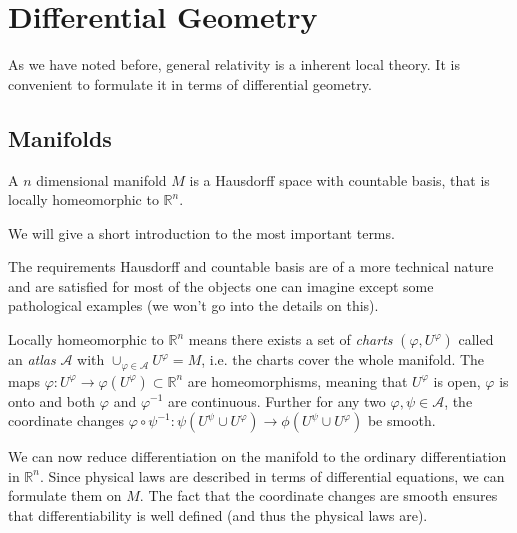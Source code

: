 \chapter{Differential Geometry}
As we have noted before, general relativity is a inherent local theory. It is
convenient to formulate it in terms of differential geometry.
\section{Manifolds}
\begin{definition}
A $n$ dimensional manifold $M$ is a Hausdorff space with countable basis, that
is locally homeomorphic to $\mathbb{R}^n$. 
\end{definition}
We will give a short introduction to
the most important terms.
\begin{remark}
The requirements Hausdorff and countable basis are of a more technical nature and are satisfied for most of the objects one can imagine 
except some pathological examples (we won't go into the details on this).

Locally homeomorphic to $\mathbb{R}^n$ means there exists a set of \emph{charts} 
$(\varphi,U^\varphi)$ called an \emph{atlas} $\mathcal{A}$ with $\cup_{\varphi\in\mathcal{A}} U^\varphi =M$, 
i.e. the charts cover the whole manifold. The maps $\varphi:U^\varphi\to \varphi(U^\varphi)\subset\mathbb{R}^n $ are homeomorphisms, 
meaning that $U^\varphi$ is open, $\varphi$ is onto and both $\varphi$ and
$\varphi^{-1}$ are continuous.
Further for any two $\varphi,\psi\in \mathcal{A}$, the coordinate changes 
$\varphi\circ\psi^{-1}:\psi(U^\psi\cup U^\varphi)\to \phi(U^\psi\cup U^\varphi)$
be smooth\footnotemark .
\end{remark}
We can now reduce differentiation on the manifold to the ordinary differentiation in $\mathbb{R}^n$. 
Since physical laws are described in terms of differential equations, we can formulate them on $M$. 
The fact that the coordinate changes are smooth ensures that differentiability
is well defined (and thus the physical laws are).

